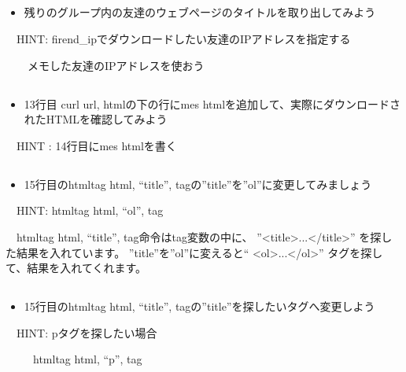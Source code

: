 \clearpage\subsection*{\theQuestion\label{Q:title}}
\begin{itemize}
\item
残りのグループ内の友達のウェブページのタイトルを取り出してみよう
\end{itemize}
\ \ HINT:
firend\_ipでダウンロードしたい友達のIPアドレスを指定する

\ \ \ \ メモした友達のIPアドレスを使おう

\subsection*{\theQuestion\label{Q:mes}}
\begin{itemize}
\item 13行目 curl url, htmlの下の行にmes
htmlを追加して、実際にダウンロードされたHTMLを確認してみよう
\end{itemize}
\ \ HINT : 14行目にmes htmlを書く

\subsection*{\theQuestion\label{Q:ol}}
\begin{itemize}
\item 15行目のhtmltag html, “title”,
tagの”title”を”ol”に変更してみましょう
\end{itemize}
\ \ HINT: htmltag html, “ol”, tag

\ \ htmltag html, “title”,
tag命令はtag変数の中に、
”{\textless}title{\textgreater}...{\textless}/title{\textgreater}”
を探した結果を入れています。
”title”を”ol”に変えると“
{\textless}ol{\textgreater}...{\textless}/ol{\textgreater}”
タグを探して、結果を入れてくれます。


\subsection*{\theQuestion\label{Q:tag}}
\begin{itemize}
\item 15行目のhtmltag html, “title”,
tagの”title”を探したいタグへ変更しよう
\end{itemize}
\ \ HINT: pタグを探したい場合

\ \ \ \ \ htmltag html, “p”, tag

